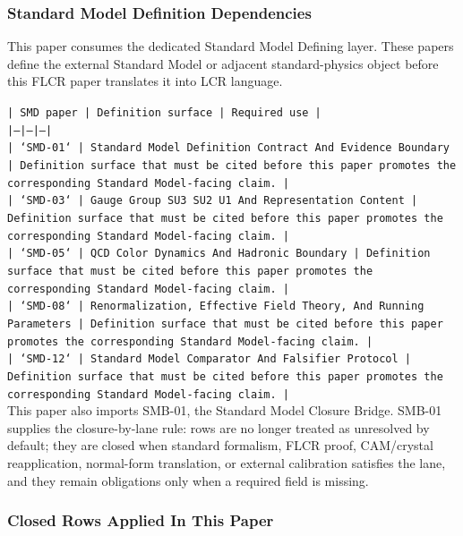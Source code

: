 \documentclass[11pt]{article}
\begin{document}
\subsubsection*{Standard Model Definition Dependencies}

This paper consumes the dedicated Standard Model Defining layer. These papers define the external Standard Model or adjacent standard-physics object before this FLCR paper translates it into LCR language.

\noindent\texttt{| SMD paper | Definition surface | Required use |}\\
\noindent\texttt{|---|---|---|}\\
\noindent\texttt{| `SMD-01` | Standard Model Definition Contract And Evidence Boundary | Definition surface that must be cited before this paper promotes the corresponding Standard Model-facing claim. |}\\
\noindent\texttt{| `SMD-03` | Gauge Group SU3 SU2 U1 And Representation Content | Definition surface that must be cited before this paper promotes the corresponding Standard Model-facing claim. |}\\
\noindent\texttt{| `SMD-05` | QCD Color Dynamics And Hadronic Boundary | Definition surface that must be cited before this paper promotes the corresponding Standard Model-facing claim. |}\\
\noindent\texttt{| `SMD-08` | Renormalization, Effective Field Theory, And Running Parameters | Definition surface that must be cited before this paper promotes the corresponding Standard Model-facing claim. |}\\
\noindent\texttt{| `SMD-12` | Standard Model Comparator And Falsifier Protocol | Definition surface that must be cited before this paper promotes the corresponding Standard Model-facing claim. |}\\

This paper also imports SMB-01, the Standard Model Closure Bridge. SMB-01 supplies the closure-by-lane rule: rows are no longer treated as unresolved by default; they are closed when standard formalism, FLCR proof, CAM/crystal reapplication, normal-form translation, or external calibration satisfies the lane, and they remain obligations only when a required field is missing.

\subsubsection*{Closed Rows Applied In This Paper}
\end{document}
